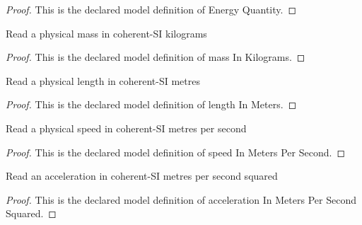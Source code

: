 \begin{proof}
  This is the declared model definition of Energy Quantity.
\end{proof}
\begin{definition}
  \label{def:physics:phyx-mini-0774:phyxminiproblems-problemphyxmini0774-massinkilograms}
  Read a physical mass in coherent-SI kilograms
\end{definition}
\begin{proof}
  This is the declared model definition of mass In Kilograms.
\end{proof}
\begin{definition}
  \label{def:physics:phyx-mini-0774:phyxminiproblems-problemphyxmini0774-lengthinmeters}
  Read a physical length in coherent-SI metres
\end{definition}
\begin{proof}
  This is the declared model definition of length In Meters.
\end{proof}
\begin{definition}
  \label{def:physics:phyx-mini-0774:phyxminiproblems-problemphyxmini0774-speedinmeterspersecond}
  Read a physical speed in coherent-SI metres per second
\end{definition}
\begin{proof}
  This is the declared model definition of speed In Meters Per Second.
\end{proof}
\begin{definition}
  \label{def:physics:phyx-mini-0774:phyxminiproblems-problemphyxmini0774-accelerationinmeterspersecondsquared}
  Read an acceleration in coherent-SI metres per second squared
\end{definition}
\begin{proof}
  This is the declared model definition of acceleration In Meters Per Second Squared.
\end{proof}
